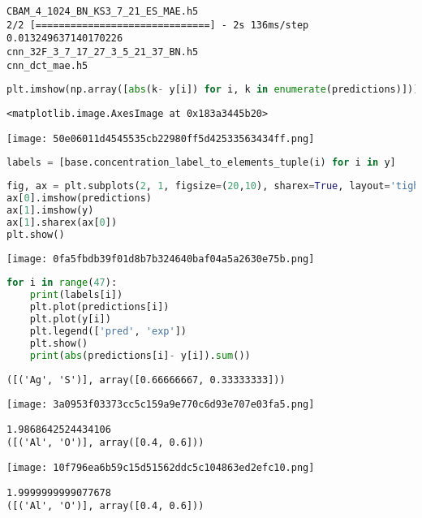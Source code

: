 \begin{lstlisting}
CBAM_4_1024_BN_KS3_7_21_ES_MAE.h5
2/2 [==============================] - 2s 136ms/step
0.013249637140170226
cnn_32F_3_7_17_27_3_5_21_37_BN.h5
cnn_dct_mae.h5
\end{lstlisting}

\begin{lstlisting}[language=Python]
plt.imshow(np.array([abs(k- y[i]) for i, k in enumerate(predictions)]))
\end{lstlisting}

\begin{lstlisting}
<matplotlib.image.AxesImage at 0x183a3445b20>
\end{lstlisting}

\texttt{[image: 50e06011d4545535cb22980ff5d42533563434ff.png]}

\begin{lstlisting}[language=Python]
labels = [base.concentration_label_to_elements_tuple(i) for i in y]
\end{lstlisting}

\begin{lstlisting}[language=Python]
fig, ax = plt.subplots(2, 1, figsize=(20,10), sharex=True, layout='tight')
ax[0].imshow(predictions)
ax[1].imshow(y)
ax[1].sharex(ax[0])
plt.show()
\end{lstlisting}

\texttt{[image: 0fa5fbdb39f01d8b7b324640baf04a5a2630e75b.png]}

\begin{lstlisting}[language=Python]
for i in range(47):
    print(labels[i])
    plt.plot(predictions[i])
    plt.plot(y[i])
    plt.legend(['pred', 'exp'])
    plt.show()
    print(abs(predictions[i]- y[i]).sum())
\end{lstlisting}

\begin{lstlisting}
([('Ag', 'S')], array([0.66666667, 0.33333333]))
\end{lstlisting}

\texttt{[image: 3a0953f03373cc5c159a9e770c6d93e707e03fa5.png]}

\begin{lstlisting}
1.9868642524434106
([('Al', 'O')], array([0.4, 0.6]))
\end{lstlisting}

\texttt{[image: 10f796ea6b59c15d51562ddc5c104863ed2efc10.png]}

\begin{lstlisting}
1.9999999999077678
([('Al', 'O')], array([0.4, 0.6]))
\end{lstlisting}

